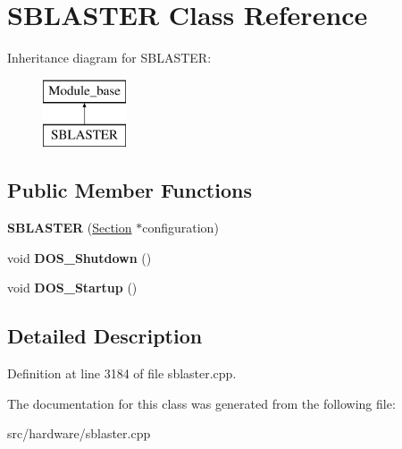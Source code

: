 \hypertarget{classSBLASTER}{\section{S\-B\-L\-A\-S\-T\-E\-R Class Reference}
\label{classSBLASTER}
}
Inheritance diagram for S\-B\-L\-A\-S\-T\-E\-R\-:\begin{figure}[H]
\begin{center}
\leavevmode
\includegraphics[height=2.000000cm]{classSBLASTER}
\end{center}
\end{figure}
\subsection*{Public Member Functions}
\begin{DoxyCompactItemize}
\item 
\hypertarget{classSBLASTER_a2e4295f253cbfbfaf7a09f6958ab884c}{{\bfseries S\-B\-L\-A\-S\-T\-E\-R} (\hyperlink{classSection}{Section} $\ast$configuration)}\label{classSBLASTER_a2e4295f253cbfbfaf7a09f6958ab884c}

\item 
\hypertarget{classSBLASTER_a5914aae53429ba3178b2e88015cffd23}{void {\bfseries D\-O\-S\-\_\-\-Shutdown} ()}\label{classSBLASTER_a5914aae53429ba3178b2e88015cffd23}

\item 
\hypertarget{classSBLASTER_a13b1b3922dde7975afc8da6b0967c569}{void {\bfseries D\-O\-S\-\_\-\-Startup} ()}\label{classSBLASTER_a13b1b3922dde7975afc8da6b0967c569}

\end{DoxyCompactItemize}


\subsection{Detailed Description}


Definition at line 3184 of file sblaster.\-cpp.



The documentation for this class was generated from the following file\-:\begin{DoxyCompactItemize}
\item 
src/hardware/sblaster.\-cpp\end{DoxyCompactItemize}

